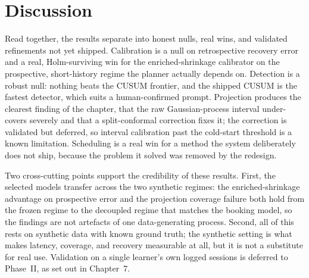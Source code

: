 \section{Discussion}
Read together, the results separate into honest nulls, real wins, and validated refinements not yet shipped. Calibration is a null on retrospective recovery error and a real, Holm-surviving win for the enriched-shrinkage calibrator on the prospective, short-history regime the planner actually depends on. Detection is a robust null: nothing beats the CUSUM frontier, and the shipped CUSUM is the fastest detector, which suits a human-confirmed prompt. Projection produces the clearest finding of the chapter, that the raw Gaussian-process interval under-covers severely and that a split-conformal correction fixes it; the correction is validated but deferred, so interval calibration past the cold-start threshold is a known limitation. Scheduling is a real win for a method the system deliberately does not ship, because the problem it solved was removed by the redesign.

Two cross-cutting points support the credibility of these results. First, the selected models transfer across the two synthetic regimes: the enriched-shrinkage advantage on prospective error and the projection coverage failure both hold from the frozen regime to the decoupled regime that matches the booking model, so the findings are not artefacts of one data-generating process. Second, all of this rests on synthetic data with known ground truth; the synthetic setting is what makes latency, coverage, and recovery measurable at all, but it is not a substitute for real use. Validation on a single learner's own logged sessions is deferred to Phase~II, as set out in Chapter~7.
